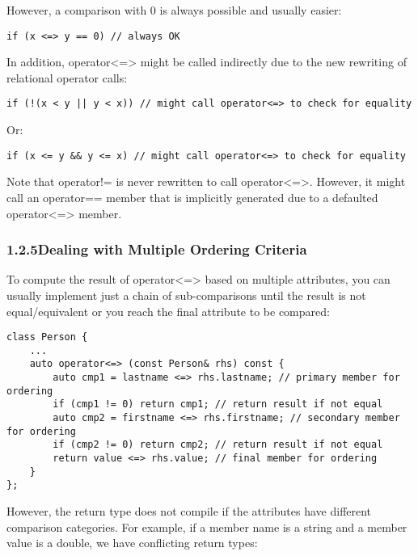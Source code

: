However, a comparison with 0 is always possible and usually easier:

\begin{lstlisting}[style=styleCXX]
if (x <=> y == 0) // always OK
\end{lstlisting}

In addition, operator<=> might be called indirectly due to the new rewriting of relational operator calls:

\begin{lstlisting}[style=styleCXX]
if (!(x < y || y < x)) // might call operator<=> to check for equality
\end{lstlisting}

Or:

\begin{lstlisting}[style=styleCXX]
if (x <= y && y <= x) // might call operator<=> to check for equality
\end{lstlisting}

Note that operator!= is never rewritten to call operator<=>. However, it might call an operator== member that is implicitly generated due to a defaulted operator<=> member.

\subsubsection*{ 1.2.5\hspace{0.2cm}Dealing with Multiple Ordering Criteria}

To compute the result of operator<=> based on multiple attributes, you can usually implement just a chain of sub-comparisons until the result is not equal/equivalent or you reach the final attribute to be compared:

\begin{lstlisting}[style=styleCXX]
class Person {
	...
	auto operator<=> (const Person& rhs) const {
		auto cmp1 = lastname <=> rhs.lastname; // primary member for ordering
		if (cmp1 != 0) return cmp1; // return result if not equal
		auto cmp2 = firstname <=> rhs.firstname; // secondary member for ordering
		if (cmp2 != 0) return cmp2; // return result if not equal
		return value <=> rhs.value; // final member for ordering
	}
};
\end{lstlisting}

However, the return type does not compile if the attributes have different comparison categories. For example, if a member name is a string and a member value is a double, we have conflicting return types:

